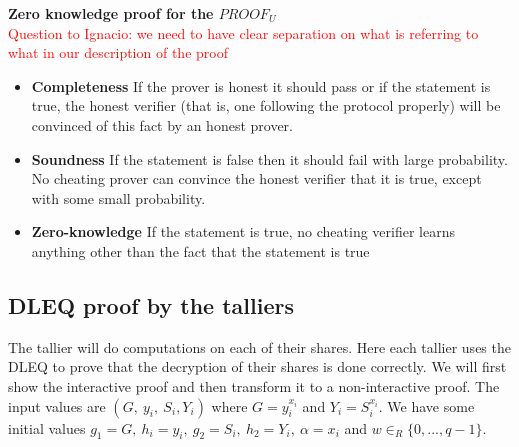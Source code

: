 \noindent
\textbf{Zero knowledge proof for the $PROOF_U$}\\
\textcolor{red}{Question to Ignacio: we need to have clear separation on what is referring to what in our description of the proof}
\begin{itemize}
    
    \item \textbf{Completeness} If the prover is honest it should pass or if the statement is true, the honest verifier (that is, one following the protocol properly) will be convinced of this fact by an honest prover.
    
    \item \textbf{Soundness} If the statement is false then it should fail with large probability. No cheating prover can convince
the honest verifier that it is true, except with some small probability.
    
    
    \item \textbf{Zero-knowledge}  If the statement is true, no cheating verifier learns anything other than the fact that the statement is true
\end{itemize}




\subsection{DLEQ proof by the talliers}
The tallier will do computations on each of their shares. Here each tallier uses the DLEQ to prove that the decryption of their shares is done correctly. We will first show the interactive proof and then transform it to a non-interactive proof. The input values are \begin{math}(G,\ y_i,\ S_i, Y_i)\end{math} where \begin{math}G = y_i^{x_i}\end{math} and  \begin{math} Y_i=S_i^{x_i}\end{math}. We have some initial values
 \begin{math}g_1 =G,\ h_i=y_i,\ g_2=S_i,\ h_2=Y_i,\ \alpha=x_i \end{math} and \begin{math}w \in_R \{0,...,q-1\}\end{math}.\\
 
